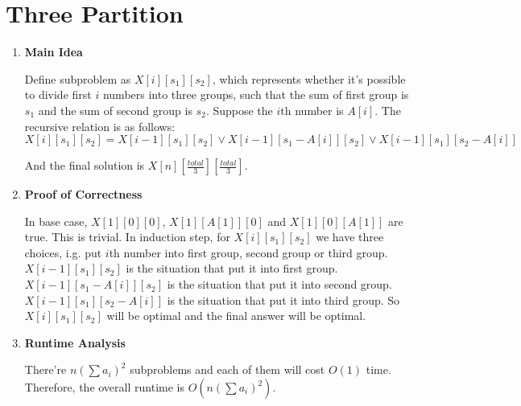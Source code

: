 \documentclass[11pt]{article}
\newenvironment{qparts}{\begin{enumerate}[{(}a{)}]}{\end{enumerate}}
\begin{document}
\section{Three Partition}
\begin{qparts}
	\item \textbf{Main Idea}
	
	Define subproblem as $X[i][s_1][s_2]$, which represents whether it's possible to divide first $i$ numbers into three groups, such that the sum of first group is $s_1$ and the sum of second group is $s_2$. Suppose the $i$th number is $A[i]$.
	The recursive relation is as follows:
	\[
		X[i][s_1][s_2] = X[i-1][s_1][s_2] \lor X[i-1][s_1 - A[i]][s_2] \lor X[i-1][s_1][s_2 - A[i]]
	\]
	
	 And the final solution is $X[n][\frac{total}{3}][\frac{total}{3}]$.

	\item \textbf{Proof of Correctness}
	
	In base case, $X[1][0][0]$, $X[1][A[1]][0]$ and $X[1][0][A[1]]$ are true. This is trivial. In induction step, for $X[i][s_1][s_2]$ we have three choices, i.g. put $i$th number into first group, second group or third group. $X[i-1][s_1][s_2]$ is the situation that put it into first group. $X[i-1][s_1 - A[i]][s_2]$ is the situation that put it into second group. $X[i-1][s_1][s_2 - A[i]]$ is the situation that put it into third group. So $X[i][s_1][s_2]$ will be optimal and the final answer will be optimal.
	
	\item \textbf{Runtime Analysis}
	
	There're $n(\sum a_i)^2$ subproblems and each of them will cost $O(1)$ time. Therefore, the overall runtime is $O(n(\sum a_i)^2)$.	

\end{qparts}

\newpage
\end{document}
